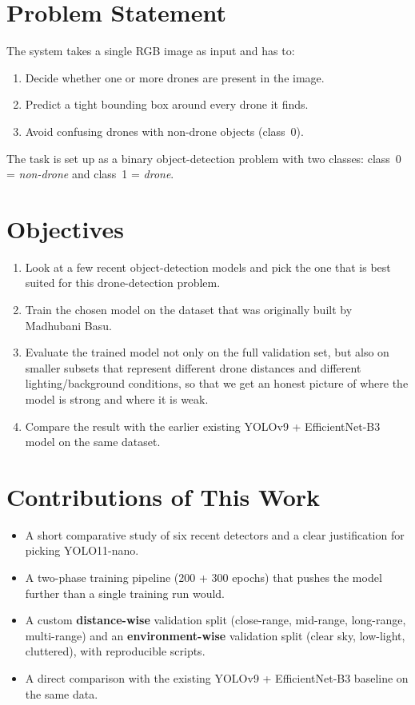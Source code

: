\documentclass[12pt,a4paper]{report}
\begin{document}
\section{Problem Statement}
The system takes a single RGB image as input and has to:
\begin{enumerate}[noitemsep]
    \item Decide whether one or more drones are present in the image.
    \item Predict a tight bounding box around every drone it finds.
    \item Avoid confusing drones with non-drone objects (class~0).
\end{enumerate}
The task is set up as a binary object-detection problem with two classes:
class~0 = \textit{non-drone} and class~1 = \textit{drone}.

\section{Objectives}
\begin{enumerate}[noitemsep]
    \item Look at a few recent object-detection models and pick the one that is
          best suited for this drone-detection problem.
    \item Train the chosen model on the dataset that was originally
          built by Madhubani Basu.
    \item Evaluate the trained model not only on the full validation set, but
          also on smaller subsets that represent different drone distances and
          different lighting/background conditions, so that we get an honest
          picture of where the model is strong and where it is weak.
    \item Compare the result with the earlier existing YOLOv9 + EfficientNet-B3
          model on the same dataset.
\end{enumerate}

\section{Contributions of This Work}
\begin{itemize}[noitemsep]
    \item A short comparative study of six recent detectors and a clear
          justification for picking YOLO11-nano.
    \item A two-phase training pipeline (200 + 300 epochs) that pushes the
          model further than a single training run would.
    \item A custom \textbf{distance-wise} validation split (close-range,
          mid-range, long-range, multi-range) and an
          \textbf{environment-wise} validation split (clear sky, low-light,
          cluttered), with reproducible scripts.
    \item A direct comparison with the existing YOLOv9 + EfficientNet-B3
          baseline on the same data.
\end{itemize}
\end{document}
